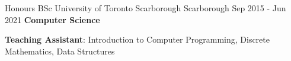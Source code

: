 
\begin{cventries}
  \cventry
    {Honours BSc}
    {University of Toronto Scarborough}
    {Scarborough}
    {Sep 2015 - Jun 2021}
    {\textbf{Computer Science}}
    {
      \begin{cvitems}
        \item {\textbf{Teaching Assistant}: Introduction to Computer Programming, Discrete Mathematics, Data Structures}
      \end{cvitems}
    }
\end{cventries}
